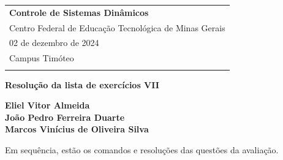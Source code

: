 \documentclass[a4paper,12pt]{article}
\begin{document}

    \thispagestyle{empty} %

    \begin{tabular}{p{15.5cm}}
    {\large \textbf{Controle de Sistemas Dinâmicos} } \\
    Centro Federal de Educação Tecnológica de Minas Gerais \\
    02 de dezembro de 2024 \\ Campus Timóteo \\
    \hline
    \\
    \end{tabular}

    \vspace*{0.3cm}

    \begin{center}
    {\Large \textbf{Resolução da lista de exercícios VII}}
        \vspace{2mm}

        {\textbf{Eliel Vitor Almeida \\ João Pedro Ferreira Duarte \\ Marcos Vinícius de Oliveira Silva }}
    \end{center}

    \vspace{0.4cm}


    Em sequência, estão os comandos e resoluções das questões da avaliação.
\end{document}
